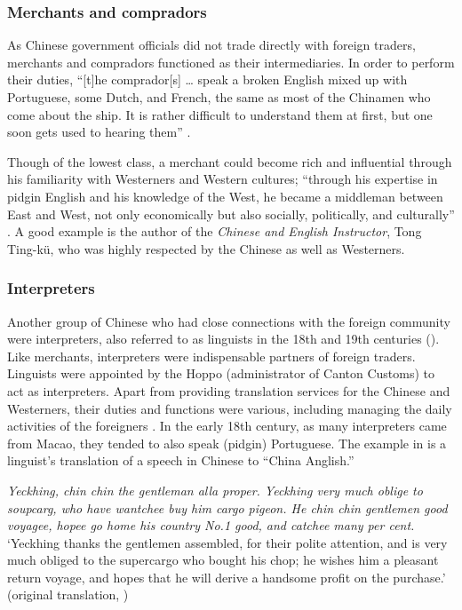 \documentclass[english,output=paper,colorlinks,citecolor=brown]{../langscibook}
\begin{document}
\subsubsection{Merchants and compradors}\label{sec:7:4.2.1}

As Chinese government officials did not trade directly with foreign traders, merchants and compradors functioned as their intermediaries. In order to perform their duties, “[t]he comprador[s] … speak a broken English mixed up with Portuguese, some Dutch, and French, the same as most of the Chinamen who come about the ship. It is rather difficult to understand them at first, but one soon gets used to hearing them” \citep[29]{Tyng1999}.

Though of the lowest class, a merchant could become rich and influential through his familiarity with Westerners and Western cultures; “through his expertise in pidgin English and his knowledge of the West, he became a middleman between East and West, not only economically but also socially, politically, and culturally” \citep[180]{Thao1970}. A good example is the author of the \textit{Chinese and English Instructor}, Tong Ting-kü, who was highly respected by the Chinese as well as Westerners.

\subsubsection{Interpreters}\label{sec:7:4.2.2}

Another group of Chinese who had close connections with the foreign community were interpreters, also referred to as linguists in the 18th and 19th centuries (\citealt[50]{Hunter1882, Van-Dyke2005}). Like merchants, interpreters were indispensable partners of foreign traders. Linguists were appointed by the Hoppo (administrator of Canton Customs) to act as interpreters. Apart from providing translation services for the Chinese and Westerners, their duties and functions were various, including managing the daily activities of the foreigners \citep{Chin2016}. In the early 18th century, as many interpreters came from Macao, they tended to also speak (pidgin) Portuguese. The example in  is a linguist’s translation of a speech in Chinese to “China Anglish.” 

\ea \label{ex:7:3}
    \textit{Yeckhing, chin chin the gentleman alla proper. Yeckhing very much oblige to soupcarg, who have wantchee buy him cargo pigeon. He chin chin gentlemen good voyagee, hopee go home his country No.1 good, and catchee many per cent.}\\
    \glt ‘Yeckhing thanks the gentlemen assembled, for their polite attention, and is very much obliged to the supercargo who bought his chop; he wishes him a pleasant return voyage, and hopes that he will derive a handsome profit on the purchase.’ (original translation, \citealt[126]{Tiffany1849})
\z
\end{document}
